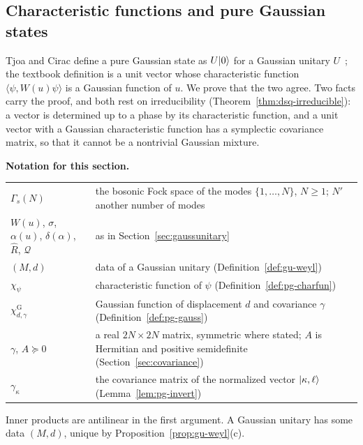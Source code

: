 \providecommand{\cU}{\mathcal U}
\providecommand{\sU}{\mathsf U}
\providecommand{\sS}{\mathsf S}
\providecommand{\Sp}{\mathrm{Sp}(2N,\R)}
\providecommand{\Un}{\mathrm{U}(N)}
\providecommand{\Rh}{\hat R}
\providecommand{\Qd}{\mathcal Q}
\providecommand{\chG}{\chi^{\mathrm G}}
\providecommand{\gk}{\gamma_\kappa}
\begin{veteenv}
\setlength{\emergencystretch}{3em}
\section{Characteristic functions and pure Gaussian states}\label{sec:puregaussian}

Tjoa and Cirac define a pure Gaussian state as $U\lvert 0\rangle$ for a Gaussian unitary $U$~\cite[(4)]{tjoacirac}; the textbook definition
is a unit vector whose characteristic function $\langle\psi,W(u)\psi\rangle$ is a Gaussian function of $u$. We prove that the two
agree. Two facts carry the proof, and both rest on irreducibility (Theorem~\ref{thm:dsq-irreducible}): a vector is determined up to
a phase by its characteristic function, and a unit vector with a Gaussian characteristic function has a symplectic covariance
matrix, so that it cannot be a nontrivial Gaussian mixture.

\medskip
\noindent\textbf{Notation for this section.}
\begin{center}
\begin{tabular}{@{}L{0.3\textwidth}L{0.64\textwidth}@{}}
$\Gamma_s(N)$ & the bosonic Fock space of the modes $\{1,\ldots,N\}$, $N\ge1$; $N'$ another number of modes\\
$W(u)$, $\sigma$, $\alpha(u)$, $\delta(\alpha)$, $\Rh$, $\Qd$ & as in Section~\ref{sec:gaussunitary}\\
$(M,d)$ & data of a Gaussian unitary (Definition~\ref{def:gu-weyl})\\
$\chi_\psi$ & characteristic function of $\psi$ (Definition~\ref{def:pg-charfun})\\
$\chG_{d,\gamma}$ & Gaussian function of displacement $d$ and covariance $\gamma$ (Definition~\ref{def:pg-gauss})\\
$\gamma$, $A\succeq0$ & a real $2N\times2N$ matrix, symmetric where stated; $A$ is Hermitian and positive semidefinite
(Section~\ref{sec:covariance})\\
$\gk$ & the covariance matrix of the normalized vector $\lvert \kappa,\ell\rangle$ (Lemma~\ref{lem:pg-invert})\\
\end{tabular}
\end{center}
Inner products are antilinear in the first argument. A Gaussian unitary has some data $(M,d)$, unique by
Proposition~\ref{prop:gu-weyl}(c).


\end{veteenv}
